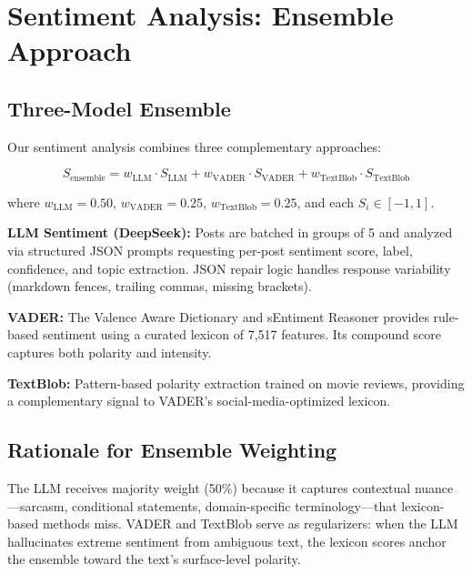 \documentclass[12pt, letterpaper]{article}
\begin{document}
\section{Sentiment Analysis: Ensemble Approach}
\label{sec:sentiment}

\subsection{Three-Model Ensemble}

Our sentiment analysis combines three complementary approaches:

\begin{equation}
    S_{\text{ensemble}} = w_{\text{LLM}} \cdot S_{\text{LLM}} + w_{\text{VADER}} \cdot S_{\text{VADER}} + w_{\text{TextBlob}} \cdot S_{\text{TextBlob}}
    \label{eq:ensemble}
\end{equation}

where $w_{\text{LLM}} = 0.50$, $w_{\text{VADER}} = 0.25$, $w_{\text{TextBlob}} = 0.25$, and each $S_i \in [-1, 1]$.

\textbf{LLM Sentiment (DeepSeek):} Posts are batched in groups of 5 and analyzed via structured JSON prompts requesting per-post sentiment score, label, confidence, and topic extraction. JSON repair logic handles response variability (markdown fences, trailing commas, missing brackets).

\textbf{VADER:} The Valence Aware Dictionary and sEntiment Reasoner \citep{hutto2014vader} provides rule-based sentiment using a curated lexicon of 7,517 features. Its compound score captures both polarity and intensity.

\textbf{TextBlob:} Pattern-based polarity extraction trained on movie reviews, providing a complementary signal to VADER's social-media-optimized lexicon.

\subsection{Rationale for Ensemble Weighting}

The LLM receives majority weight (50\%) because it captures contextual nuance---sarcasm, conditional statements, domain-specific terminology---that lexicon-based methods miss. VADER and TextBlob serve as regularizers: when the LLM hallucinates extreme sentiment from ambiguous text, the lexicon scores anchor the ensemble toward the text's surface-level polarity.
\end{document}
